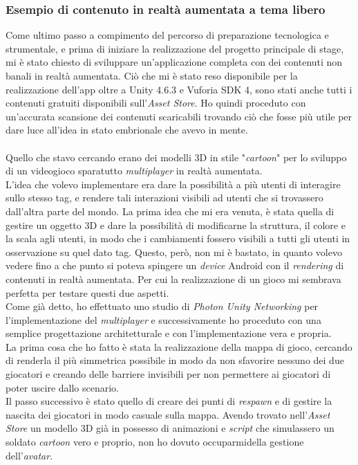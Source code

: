 \subsubsection{Esempio di contenuto in realt\`a aumentata a tema libero}
Come ultimo passo a compimento del percorso di preparazione tecnologica e strumentale, e prima di iniziare la realizzazione del progetto principale di stage, mi \`e stato chiesto di sviluppare un'applicazione completa con dei contenuti non banali in realt\`a aumentata. Ci\`o che mi \`e stato reso disponibile per la realizzazione dell'app oltre a Unity 4.6.3 e Vuforia SDK 4, sono stati anche tutti i contenuti gratuiti disponibili sull'\textit{Asset Store}. Ho quindi proceduto con un'accurata scansione dei contenuti scaricabili trovando ci\`o che fosse pi\`u utile per dare luce all'idea in stato embrionale che avevo in mente.\\\\
Quello che stavo cercando erano dei modelli 3D in stile "\textit{cartoon}" per lo sviluppo di un videogioco sparatutto \textit{multiplayer} in realt\`a aumentata.\\
L'idea che volevo implementare era dare la possibilit\`a a pi\`u utenti di interagire sullo stesso tag, e rendere tali interazioni visibili ad utenti che si trovassero dall'altra parte del mondo. La prima idea che mi era venuta, \`e stata quella di gestire un oggetto 3D e dare la possibilit\`a di modificarne la struttura, il colore e la scala agli utenti, in modo che i cambiamenti fossero visibili a tutti gli utenti in osservazione su quel dato tag. Questo, per\`o, non mi \`e bastato, in quanto volevo vedere fino a che punto si poteva spingere un \textit{device} Android con il \textit{rendering} di contenuti in realt\`a aumentata. Per cui la realizzazione di un gioco mi sembrava perfetta per testare questi due aspetti.\\
\noindent
Come gi\`a detto, ho effettuato uno studio di \textit{Photon Unity Networking} per l'implementazione del \textit{multiplayer} e successivamente ho proceduto con una semplice progettazione architetturale e con l'implementazione vera e propria.\\
\noindent
La prima cosa che ho fatto \`e stata la realizzazione della mappa di gioco, cercando di renderla il pi\`u simmetrica possibile in modo da non sfavorire nessuno dei due giocatori e creando delle barriere invisibili per non permettere ai giocatori di poter uscire dallo scenario.\\
Il passo successivo \`e stato quello di creare dei punti di \textit{respawn} e di gestire la nascita dei giocatori in modo casuale sulla mappa. Avendo trovato nell'\textit{Asset Store} un modello 3D gi\`a in possesso di animazioni e \textit{script} che simulassero un soldato \textit{cartoon} vero e proprio, non ho dovuto occuparmidella gestione dell'\textit{avatar\gloss}.\\
